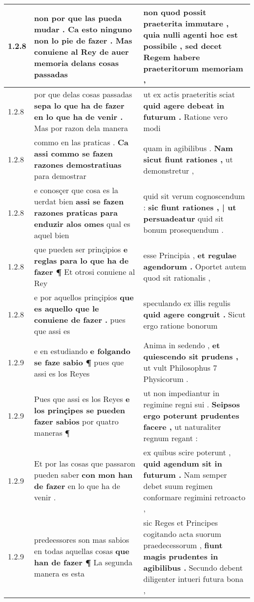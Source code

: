 \begin{tabular}{|p{1cm}|p{6.5cm}|p{6.5cm}|}
1.2.8 & non por que las pueda mudar . \textbf{ Ca esto ninguno non lo pie de fazer . } Mas conuiene al Rey de auer memoria delans cosas passadas & non quod possit praeterita immutare , \textbf{ quia nulli agenti hoc est possibile , } sed decet Regem habere praeteritorum memoriam , \\\hline
1.2.8 & por que delas cosas passadas \textbf{ sepa lo que ha de fazer en lo que ha de venir . } Mas por razon dela manera & ut ex actis praeteritis sciat \textbf{ quid agere debeat in futurum . } Ratione vero modi \\\hline
1.2.8 & commo en las praticas . \textbf{ Ca assi commo se fazen razones demostratiuas } para demostrar & quam in agibilibus . \textbf{ Nam sicut fiunt rationes , } ut demonstretur , \\\hline
1.2.8 & e conosçer que cosa es la uerdat bien \textbf{ assi se fazen razones praticas para enduzir alos omes } qual es aquel bien & quid sit verum cognoscendum : \textbf{ sic fiunt rationes , | ut persuadeatur } quid sit bonum prosequendum . \\\hline
1.2.8 & que pueden ser prinçipios \textbf{ e reglas para lo que ha de fazer ¶ } Et otrosi conuiene al Rey & esse Principia , \textbf{ et regulae agendorum . } Oportet autem quod sit rationalis , \\\hline
1.2.8 & e por aquellos prinçipios \textbf{ que es aquello que le conuiene de fazer . } pues que assi es & speculando ex illis regulis \textbf{ quid agere congruit . } Sicut ergo ratione bonorum \\\hline
1.2.9 & e en estudiando \textbf{ e folgando se faze sabio ¶ } pues que assi es los Reyes & Anima in sedendo , \textbf{ et quiescendo sit prudens , } ut vult Philosophus 7 Physicorum . \\\hline
1.2.9 & Pues que assi es los Reyes \textbf{ e los prinçipes se pueden fazer sabios } por quatro maneras ¶ & ut non impediantur in regimine regni sui . \textbf{ Seipsos ergo poterunt prudentes facere , } ut naturaliter regnum regant : \\\hline
1.2.9 & Et por las cosas que passaron pueden saber \textbf{ con mon han de fazer } en lo que ha de venir . & ex quibus scire poterunt , \textbf{ quid agendum sit in futurum . } Nam semper debet suum regimen conformare regimini retroacto , \\\hline
1.2.9 & predeessores son mas sabios en todas aquellas cosas \textbf{ que han de fazer ¶ } La segunda manera es esta & sic Reges et Principes cogitando acta suorum praedecessorum , \textbf{ fiunt magis prudentes in agibilibus . } Secundo debent diligenter intueri futura bona , \\\hline

\end{tabular}
